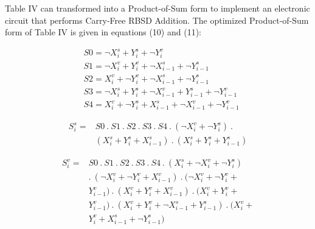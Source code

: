 \documentclass[conference]{IEEEtran}
\begin{document}
Table IV can transformed into a Product-of-Sum form to implement an electronic circuit that performs Carry-Free RBSD Addition. The optimized Product-of-Sum form of Table IV is given in equations (10) and (11):

\vspace{-1em}
\begin{align}
&S0 = \neg X_{i}^{s} + Y_{i}^{s} + \neg Y_{i}^{v}\\
&S1 = \neg X_{i}^{v} + Y_{i}^{v} + \neg X_{i-1}^{s} + \neg Y_{i-1}^{s}\\
&S2 = X_{i}^{v} + \neg Y_{i}^{v} + \neg X_{i-1}^{s} + \neg Y_{i-1}^{s}\\
&S3 = \neg X_{i}^{s} + Y_{i}^{s} + \neg X_{i-1}^{v} + Y_{i-1}^{s} + \neg Y_{i-1}^{v}\\
&S4 = X_{i}^{v} + \neg Y_{i}^{s} + X_{i-1}^{s} + \neg X_{i-1}^{v} + \neg Y_{i-1}^{v}
\end{align}

\vspace{-1em}
\begin{equation}
\begin{aligned}
S_{i}^s ={} &S0 \ . \ S1 \ . \ S2 \ . \ S3 \ . \ S4 \ . \ (\neg X_{i}^{v} + \neg Y_{i}^{s}) \ . \ \\
&(X_{i}^{s} + Y_{i}^{s} + X_{i-1}^{s}) \ . \ (X_{i}^{s} + Y_{i}^{s} + Y_{i-1}^{s})
\end{aligned}
\end{equation}

\vspace{-1em}
\begin{equation}
\begin{aligned}
S_{i}^v ={} &S0 \ . \ S1 \ . \ S2 \ . \ S3 \ . \ S4 \ . \ (X_{i}^{s} + \neg X_{i}^{v} + \neg Y_{i}^{s}) \ \\
&. \ (\neg X_{i}^{v} + \neg Y_{i}^{v} + X_{i-1}^{v}) \ . \ (\neg X_{i}^{v} + \neg Y_{i}^{v} + \\
&Y_{i-1}^{v}) \ . \ (X_{i}^{v} + Y_{i}^{v} + X_{i-1}^{v}) \ . \ (X_{i}^{v} + Y_{i}^{v} + \\
&Y_{i-1}^{v}) \ . \ (X_{i}^{v} + Y_{i}^{v} + \neg X_{i-1}^{s} + Y_{i-1}^{s}) \ . \ (X_{i}^{v} + \\
&Y_{i}^{v} + X_{i-1}^{s} + \neg Y_{i-1}^{s})
\end{aligned}
\end{equation}
\end{document}

